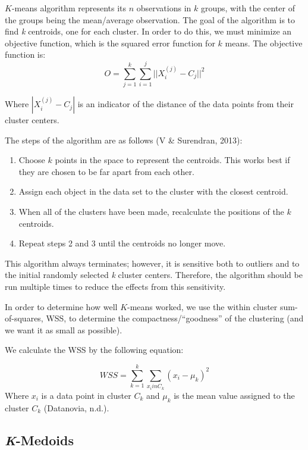 \documentclass[12pt,twoside]{amherstthesis}
\begin{document}
  \(K\)-means algorithm represents its \(n\) observations in \(k\) groups,
  with the center of the groups being the mean/average observation. The
  goal of the algorithm is to find \emph{k} centroids, one for each
  cluster. In order to do this, we must minimize an objective function,
  which is the squared error function for \(k\) means. The objective
  function is: \[O= \sum_{j=1}^k \sum_{i=1}^j ||{{X_i^{(j)}- C_j}}||^2\]
  
  Where \(|{{X_i^{(j)}- C_j}}|\) is an indicator of the distance of the
  data points from their cluster centers.
  
  The steps of the algorithm are as follows (V \& Surendran, 2013):
  
  \begin{enumerate}
  \def\labelenumi{\arabic{enumi}.}
  \item
    Choose \(k\) points in the space to represent the centroids. This
    works best if they are chosen to be far apart from each other.
  \item
    Assign each object in the data set to the cluster with the closest
    centroid.
  \item
    When all of the clusters have been made, recalculate the positions of
    the \(k\) centroids.
  \item
    Repeat steps 2 and 3 until the centroids no longer move.
  \end{enumerate}
  
  This algorithm always terminates; however, it is sensitive both to
  outliers and to the initial randomly selected \emph{k} cluster centers.
  Therefore, the algorithm should be run multiple times to reduce the
  effects from this sensitivity.
  
  In order to determine how well \(K\)-means worked, we use the within
  cluster sum-of-squares, WSS, to determine the compactness/``goodness''
  of the clustering (and we want it as small as possible).
  
  We calculate the WSS by the following equation:
  
  \[WSS = \sum_{k=1}^k \sum_{x_i in C_k} ({{x_i- \mu_k}})^2\] Where
  \(x_i\) is a data point in cluster \(C_k\) and \(\mu_k\) is the mean
  value assigned to the cluster \(C_k\) (Datanovia, n.d.).
  
  \subsection{\texorpdfstring{\emph{K}-Medoids}{K-Medoids}}\label{k-medoids}
  
\end{document}
